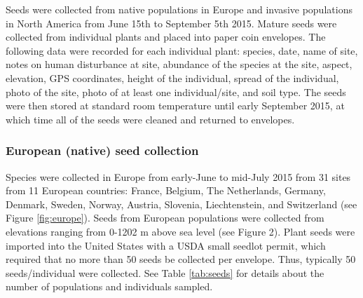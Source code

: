 \documentclass[12pt]{article}\usepackage[]{graphicx}\usepackage[]{color}
\begin{document}
	Seeds were collected from native populations in Europe and invasive populations in North America from June 15th to September 5th 2015. Mature seeds were collected from individual plants and placed into paper coin envelopes. The following data were recorded for each individual plant: species, date, name of site, notes on human disturbance at site, abundance of the species at the site, aspect, elevation, GPS coordinates, height of the individual, spread of the individual, photo of the site, photo of at least one individual/site, and soil type. The seeds were then stored at standard room temperature until early September 2015, at which time all of the seeds were cleaned and returned to envelopes. 
	\subsubsection{European (native) seed collection} 
	Species were collected in Europe from early-June to mid-July 2015 from 31 sites from 11 European countries: France, Belgium, The Netherlands, Germany, Denmark, Sweden, Norway, Austria, Slovenia, Liechtenstein, and Switzerland (see Figure \ref{fig:europe}). Seeds from European populations were collected from elevations ranging from 0-1202 m above sea level (see Figure 2). Plant seeds were imported into the United States with a USDA small seedlot permit, which required that no more than 50 seeds be collected per envelope. Thus, typically 50 seeds/individual were collected. See Table \ref{tab:seeds} for details about the number of populations and individuals sampled. 
	
\end{document}
